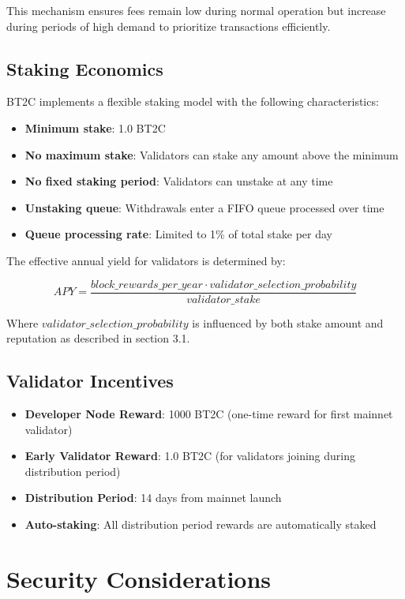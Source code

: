 \documentclass[10pt,a4paper]{article}
\begin{document}
This mechanism ensures fees remain low during normal operation but increase during periods of high demand to prioritize transactions efficiently.

\subsection{Staking Economics}
BT2C implements a flexible staking model with the following characteristics:

\begin{itemize}
\item \textbf{Minimum stake}: 1.0 BT2C
\item \textbf{No maximum stake}: Validators can stake any amount above the minimum
\item \textbf{No fixed staking period}: Validators can unstake at any time
\item \textbf{Unstaking queue}: Withdrawals enter a FIFO queue processed over time
\item \textbf{Queue processing rate}: Limited to 1\% of total stake per day
\end{itemize}

The effective annual yield for validators is determined by:

\begin{equation}
APY = \frac{block\_rewards\_per\_year \cdot validator\_selection\_probability}{validator\_stake}
\end{equation}

Where $validator\_selection\_probability$ is influenced by both stake amount and reputation as described in section 3.1.

\subsection{Validator Incentives}
\begin{itemize}
\item \textbf{Developer Node Reward}: 1000 BT2C (one-time reward for first mainnet validator)
\item \textbf{Early Validator Reward}: 1.0 BT2C (for validators joining during distribution period)
\item \textbf{Distribution Period}: 14 days from mainnet launch
\item \textbf{Auto-staking}: All distribution period rewards are automatically staked
\end{itemize}

\section{Security Considerations}
\end{document}

